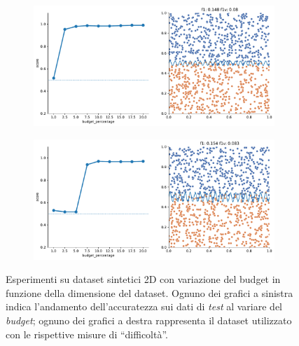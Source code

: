 \begin{figure}
\begin{subfigure}{.5\textwidth}
    \end{subfigure}%
    \hfill
    \begin{subfigure}{.5\textwidth}
        \centering
        \includegraphics[width=\textwidth]{img/2d_v2/7.pdf}
    \end{subfigure}
    \begin{subfigure}{.5\textwidth}
        \centering
        \includegraphics[width=\textwidth]{img/2d_v2/8.pdf}
    \end{subfigure}%
\caption{Esperimenti su dataset sintetici 2D con variazione del budget in funzione della dimensione del dataset. Ognuno dei grafici a sinistra indica l'andamento dell'accuratezza sui dati di \emph{test} al variare del \emph{budget}; ognuno dei grafici a destra rappresenta il dataset utilizzato con le rispettive misure di ``difficoltà''.}
\label{fig:2d_v2_1}
\end{figure}
